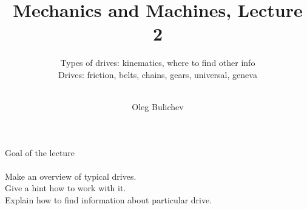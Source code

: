\documentclass[aspectratio=169]{beamer}
\title[MaM]{Mechanics and Machines, Lecture 2} %
\subtitle{Types of drives: kinematics, where to find other info
\\ Drives: friction, belts, chains, gears, universal, geneva       \\ \  
         } %
\author{Oleg Bulichev}
\newcommand{\fbckg}[1]{\usebackgroundtemplate{\texttt{[image: \#1]}}}%
\begin{document}
\setlength{\abovedisplayskip}{0pt}
\setlength{\belowdisplayskip}{0pt}
\setlength{\abovedisplayshortskip}{0pt}
\setlength{\belowdisplayshortskip}{0pt}

\fbckg{fibeamer/figs/title_page.png}

\fbckg{fibeamer/figs/common.png}

\note{\scriptsize \begin{itemize}
        \item \
    \end{itemize}}

\begin{frame}[c]{Goal of the lecture}
    \framesubtitle{}
    \LARGE
    \centering
    Make an overview of typical drives. \\ Give a hint how to work with it. \\ Explain how to find information about particular drive.
\end{frame}
\end{document}
